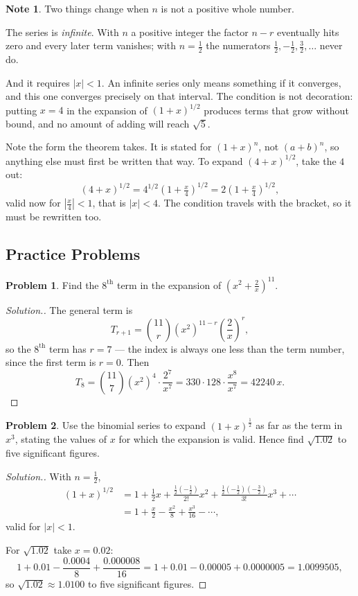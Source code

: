 \documentclass[11pt,a4paper]{article}
\theoremstyle{definition}
\newtheorem{note}[thm]{Note}
\newtheorem{problemx}{Problem}[section]
\newenvironment{problem}{\begin{problemx}}{\end{problemx}}
\newenvironment{solution}
  {\renewcommand{\qedsymbol}{}\begin{proof}[\textit{Solution}.]}
  {\end{proof}}
\begin{document}
\begin{note}
Two things change when $n$ is not a positive whole number.

The series is \emph{infinite}. With $n$ a positive integer the factor $n-r$
eventually hits zero and every later term vanishes; with $n=\frac{1}{2}$ the
numerators $\frac{1}{2},-\frac{1}{2},\frac{3}{2},\ldots$ never do.

And it requires $\left|x\right|<1$. An infinite series only means something if it
converges, and this one converges precisely on that interval. The condition is not
decoration: putting $x=4$ in the expansion of $(1+x)^{1/2}$ produces terms that
grow without bound, and no amount of adding will reach $\sqrt{5}$.

Note the form the theorem takes. It is stated for $(1+x)^{n}$, not $(a+b)^{n}$, so
anything else must first be written that way. To expand $(4+x)^{1/2}$, take the
$4$ out:
$$(4+x)^{1/2}=4^{1/2}\left(1+\tfrac{x}{4}\right)^{1/2}
=2\left(1+\tfrac{x}{4}\right)^{1/2},$$
valid now for $\left|\frac{x}{4}\right|<1$, that is $\left|x\right|<4$. The
condition travels with the bracket, so it must be rewritten too.
\end{note}

\subsection{Practice Problems}

\begin{problem}
Find the $8^{\text{th}}$ term in the expansion of
$\left(x^{2}+\frac{2}{x}\right)^{11}$.
\end{problem}

\begin{solution}
The general term is
$$T_{r+1}=\binom{11}{r}\left(x^{2}\right)^{11-r}\left(\frac{2}{x}\right)^{r},$$
so the $8^{\text{th}}$ term has $r=7$ --- the index is always one less than the term
number, since the first term is $r=0$. Then
$$T_{8}=\binom{11}{7}\left(x^{2}\right)^{4}\cdot\frac{2^{7}}{x^{7}}
=330\cdot 128\cdot\frac{x^{8}}{x^{7}}=42240\,x .$$
\end{solution}

\begin{problem}
Use the binomial series to expand $(1+x)^{\frac{1}{2}}$ as far as the term in
$x^{3}$, stating the values of $x$ for which the expansion is valid. Hence find
$\sqrt{1.02}$ to five significant figures.
\end{problem}

\begin{solution}
With $n=\frac{1}{2}$,
\begin{align*}
(1+x)^{1/2}
&=1+\tfrac{1}{2}x
 +\frac{\tfrac{1}{2}\left(-\tfrac{1}{2}\right)}{2!}x^{2}
 +\frac{\tfrac{1}{2}\left(-\tfrac{1}{2}\right)\left(-\tfrac{3}{2}\right)}{3!}x^{3}+\cdots\\
&=1+\frac{x}{2}-\frac{x^{2}}{8}+\frac{x^{3}}{16}-\cdots,
\end{align*}
valid for $\left|x\right|<1$.

For $\sqrt{1.02}$ take $x=0.02$:
$$1+0.01-\frac{0.0004}{8}+\frac{0.000008}{16}
=1+0.01-0.00005+0.0000005=1.0099505 ,$$
so $\sqrt{1.02}\approx 1.0100$ to five significant figures.
\end{solution}
\end{document}
